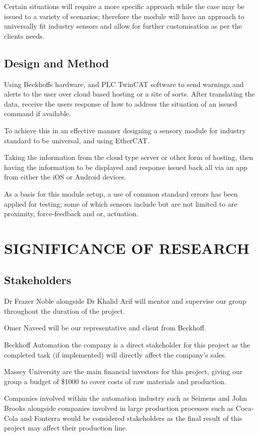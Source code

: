 \documentclass[a4paper, 10pt, conference]{IEEEconf}
\begin{document}
Certain situations will require a more specific approach while the case may be issued to a variety of scenarios; therefore the module will have an approach to universally fit industry sensors and allow for further customisation as per the clients needs.

\subsection{Design and Method}
Using Beckhoffs hardware, and PLC TwinCAT software to send warnings and alerts to the user over cloud based hosting or a site of sorts. After translating the data, receive the users response of how to address the situation of an issued command if available. 

To achieve this in an effective manner designing a sensory module for industry standard to be universal, and using EtherCAT.

Taking the information from the cloud type server or other form of hosting, then having the information to be displayed and response issued back all via an app from either the iOS or Android devices.

As a basis for this module setup, a use of common standard errors has been applied for testing; some of which sensors include but are not limited to are proximity, force-feedback and or, actuation.


\section{SIGNIFICANCE OF RESEARCH}

\subsection{Stakeholders} 
Dr Frazer Noble alongside Dr Khalid Arif will mentor and supervise our group throughout the duration of the project.

Omer Naveed will be our representative and client from Beckhoff. 

Beckhoff Automation the company is a direct stakeholder for this project as the completed task (if implemented) will directly affect the company's sales.

Massey University are the main financial investors for this project, giving our group a budget of \$1000 to cover costs of raw materials and production.

Companies involved within the automation industry such as Seimens and John Brooks alongside companies involved in large production processes such as Coca-Cola and Fonterra would be considered stakeholders as the final result of this project may affect their production line.
\end{document}
